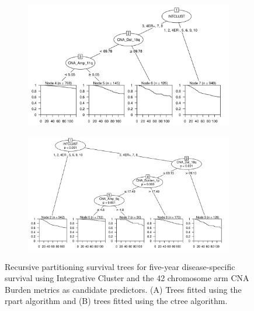 \begin{figure}[!h]
\centering

\vspace{0.5cm}

\begin{subfigure}{\textwidth}
\subcaption{}
\includegraphics[width=1\textwidth]{../figures/Chapter_3/PA_PartyKit_Survival_Burden_TenYearDSS_INTCLUST.png}
\end{subfigure}

\vspace{2cm}

\begin{subfigure}{\textwidth}
\subcaption{}
\includegraphics[width=1\textwidth]{../figures/Chapter_3/PA_Ctree_Survival_Burden_TenYearDSS_INTCLUST.png}
\end{subfigure}

\vspace{0.5cm}

\caption[Recursive partitioning survival trees for five-year disease-specific survival using Integrative Cluster and the 42 chromosome arm CNA Burden metrics as candidate predictors.]{Recursive partitioning survival trees for five-year disease-specific survival using  Integrative Cluster and the 42 chromosome arm CNA Burden metrics as candidate predictors. (A) Trees fitted using the rpart algorithm and (B) trees fitted using the ctree algorithm.}
\label{fig:INTCLUST_PA_CNA_Burden_TenYearDSS}
\end{figure}

